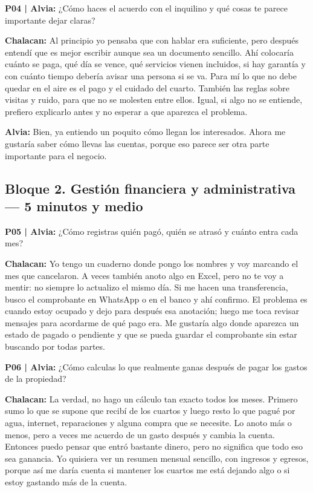 \documentclass[11pt,a4paper]{article}
\newcommand{\habla}[2]{
    \par\noindent\hspace*{0.8em}\textbf{#1:} #2\par
}
\newcommand{\pregunta}[2]{
    \par\noindent\textbf{P#1 | Alvia:} #2\par
}
\begin{document}
\clearpage

\pregunta{04}{
¿Cómo haces el acuerdo con el inquilino y qué cosas te parece importante dejar claras?
}

\habla{Chalacan}{
Al principio yo pensaba que con hablar era suficiente, pero después entendí que es mejor escribir aunque sea un documento sencillo. Ahí colocaría cuánto se paga, qué día se vence, qué servicios vienen incluidos, si hay garantía y con cuánto tiempo debería avisar una persona si se va. Para mí lo que no debe quedar en el aire es el pago y el cuidado del cuarto. También las reglas sobre visitas y ruido, para que no se molesten entre ellos. Igual, si algo no se entiende, prefiero explicarlo antes y no esperar a que aparezca el problema.
}

\habla{Alvia}{
Bien, ya entiendo un poquito cómo llegan los interesados. Ahora me gustaría saber cómo llevas las cuentas, porque eso parece ser otra parte importante para el negocio.
}



\subsection*{Bloque 2. Gestión financiera y administrativa — 5 minutos y medio}

\pregunta{05}{
¿Cómo registras quién pagó, quién se atrasó y cuánto entra cada mes?
}

\habla{Chalacan}{
Yo tengo un cuaderno donde pongo los nombres y voy marcando el mes que cancelaron. A veces también anoto algo en Excel, pero no te voy a mentir: no siempre lo actualizo el mismo día. Si me hacen una transferencia, busco el comprobante en WhatsApp o en el banco y ahí confirmo. El problema es cuando estoy ocupado y dejo para después esa anotación; luego me toca revisar mensajes para acordarme de qué pago era. Me gustaría algo donde aparezca un estado de pagado o pendiente y que se pueda guardar el comprobante sin estar buscando por todas partes.
}


\pregunta{06}{
¿Cómo calculas lo que realmente ganas después de pagar los gastos de la propiedad?
}

\habla{Chalacan}{
La verdad, no hago un cálculo tan exacto todos los meses. Primero sumo lo que se supone que recibí de los cuartos y luego resto lo que pagué por agua, internet, reparaciones y alguna compra que se necesite. Lo anoto más o menos, pero a veces me acuerdo de un gasto después y cambia la cuenta. Entonces puedo pensar que entró bastante dinero, pero no significa que todo eso sea ganancia. Yo quisiera ver un resumen mensual sencillo, con ingresos y egresos, porque así me daría cuenta si mantener los cuartos me está dejando algo o si estoy gastando más de la cuenta.
}
\end{document}

